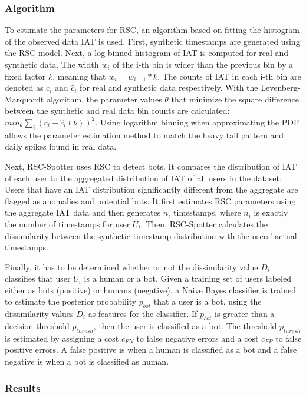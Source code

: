 \documentclass[11pt, oneside]{article}   	%
\begin{document}
\subsubsection*{Algorithm}

\quad To estimate the parameters for RSC, an algorithm based on fitting the histogram of the observed data IAT is used.
First, synthetic timestamps are generated using the RSC model.
Next, a log-binned histogram of IAT is computed for real and synthetic data.
The width $w_i$ of the i-th bin is wider than the previous bin by a fixed factor $k$, meaning that $w_i=w_{i-1}*k$.
The counts of IAT in each i-th bin are denoted as $c_i$ and $\hat{c}_i$ for real and synthetic data respectively.
With the Levenberg-Marquardt algorithm, the parameter values $\theta$ that minimize the square difference between the synthetic and real data bin counts are calculated: $min_{\theta} \sum_i (c_i - \hat{c}_i(\theta))^2$.
Using logarithm binning when approximating the PDF allows the parameter estimation method to match the heavy tail pattern and daily spikes found in real data.

\quad Next, RSC-Spotter uses RSC to detect bots.
It compares the distribution of IAT of each user to the aggregated distribution of IAT of all users in the dataset.
Users that have an IAT distribution significantly different from the aggregate are flagged as anomalies and potential bots.
It first estimates RSC parameters using the aggregate IAT data and then generates $n_i$ timestamps, where $n_i$ is exactly the number of timestamps for user $U_i$.
Then, RSC-Spotter calculates the dissimilarity between the synthetic timestamp distribution with the users' actual timestamps.

\quad Finally, it has to be determined whether or not the dissimilarity value $D_i$ classifies that user $U_i$ is a human or a bot.
Given a training set of users labeled either as bots (positive) or humans (negative), a Naive Bayes classifier is trained to estimate the posterior probability $p_{bot}$ that a user is a bot, using the dissimilarity values $D_i$ as features for the classifier.
If $p_{bot}$ is greater than a decision threshold $p_{thresh}$, then the user is classified as a bot.
The threshold $p_{thresh}$ is estimated by assigning a cost $c_{FN}$ to false negative errors and a cost $c_{FP}$ to false positive errors.
A false positive is when a human is classified as a bot and a false negative is when a bot is classified as human.

\subsubsection*{Results}
\end{document}
